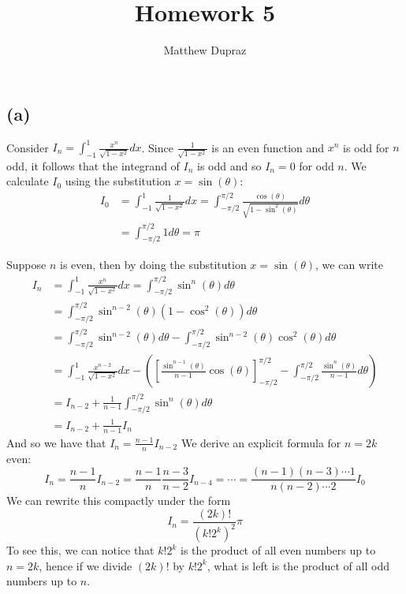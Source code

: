 \documentclass{article}
\title{Homework 5}
\author{Matthew Dupraz}
\begin{document}
\maketitle

\subsection*{(a)}

Consider $I_n = \int_{-1}^1 \frac{x^n}{\sqrt{1- x^2}} dx$.
Since $\frac{1}{\sqrt{1 - x^2}}$ is an even function and $x^n$ is odd for $n$
odd, it follows that the integrand of $I_n$ is odd and so $I_n = 0$ for odd $n$.
We calculate $I_0$ using the substitution $x = \sin(\theta)$:
\begin{align*}
	I_0 &= \int_{-1}^1 \frac{1}{\sqrt{1 - x^2}} dx
	= \int_{-\pi/2}^{\pi/2} \frac{\cos(\theta)}{\sqrt{1 - \sin^2(\theta)}}
	d\theta\\
	&= \int_{-\pi/2}^{\pi/2}1 d\theta = \pi
\end{align*}

Suppose $n$ is even, then by doing the substitution $x = \sin(\theta)$, we can
write
\begin{align*}
	I_n &= \int_{-1}^1 \frac{x^n}{\sqrt{1 - x^2}} dx 
	= \int_{-\pi/2}^{\pi/2} \sin^n(\theta) d\theta\\
	&= \int_{-\pi/2}^{\pi/2} \sin^{n-2}(\theta)(1 - \cos^2(\theta)) d\theta\\
	&= \int_{-\pi/2}^{\pi/2} \sin^{n-2}(\theta) d\theta
	- \int_{-\pi/2}^{\pi/2} \sin^{n-2}(\theta)\cos^2(\theta) d\theta\\
	&= \int_{-1}^1 \frac{x^{n-2}}{\sqrt{1 - x^2}} dx
	- \left( \left[ \frac{\sin^{n-1}(\theta)}{n-1}\cos(\theta)
	\right]_{-\pi/2}^{\pi/2}
	- \int_{-\pi/2}^{\pi/2} \frac{\sin^n(\theta)}{n-1} d\theta\right)\\
	&= I_{n-2} + \frac{1}{n-1} \int_{-\pi/2}^{\pi/2} \sin^n(\theta) d\theta\\
	&= I_{n-2} + \frac{1}{n-1} I_n
\end{align*}
And so we have that $I_n = \frac{n-1}{n}I_{n-2}$
We derive an explicit formula for $n = 2k$ even:
\begin{equation*}
	I_n = \frac{n-1}{n}I_{n-2} = \frac{n-1}{n}\frac{n-3}{n-2}I_{n-4}
	= \cdots = \frac{(n-1)(n-3)\cdots 1}{n(n-2)\cdots 2}I_0
\end{equation*}
We can rewrite this compactly under the form
\begin{equation*}
	I_n = \frac{(2k)!}{(k!2^k)^2} \pi
\end{equation*}
To see this, we can notice that $k!2^k$ is the product of all even numbers up to
$n = 2k$, hence if we divide $(2k)!$ by $k!2^k$, what is left is the product of
all odd numbers up to $n$.
\end{document}
